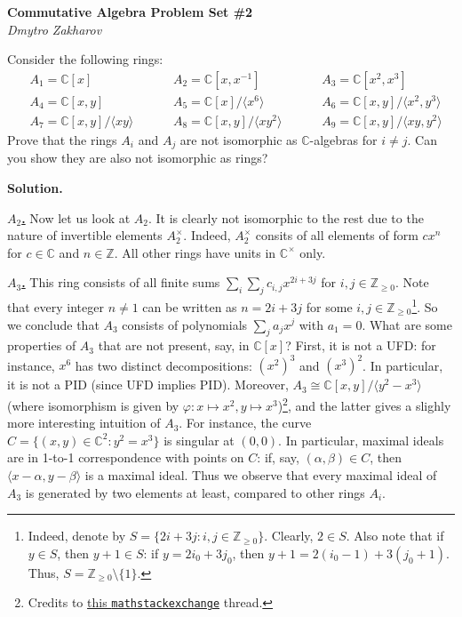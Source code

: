 \documentclass{template}
\begin{document}
\begin{center}
    \Large \textcolor{blue!70!black}{\textbf{Commutative Algebra Problem Set \#2}} \\
    \normalsize \textit{Dmytro Zakharov}
\end{center}

\begin{problem}[Exercise 1]
    Consider the following rings:
    \begin{align*}
        &A_1 = \mathbb{C}[x] && &&A_2 = \mathbb{C}[x,x^{-1}] && &&A_3 = \mathbb{C}[x^2,x^3] \\
        &A_4 = \mathbb{C}[x,y] && &&A_5 = \mathbb{C}[x]/\langle x^6 \rangle && &&A_6 = \mathbb{C}[x,y]/\langle x^2, y^3 \rangle \\
        &A_7 = \mathbb{C}[x,y]/\langle xy \rangle && &&A_8 = \mathbb{C}[x,y] / \langle xy^2 \rangle && && A_9 = \mathbb{C}[x,y] / \langle xy, y^2 \rangle
    \end{align*}
    Prove that the rings $A_i$ and $A_j$ are not isomorphic as
$\mathbb{C}$-algebras for $i \neq j$. Can you show they are also not isomorphic
as rings?
\end{problem}

\textbf{Solution.} 

\textcolor{blue!70!black}{\textbf{\underline{$A_2$.}}} Now let us look at $A_2$.
It is clearly not isomorphic to the rest due to the nature of invertible
elements $A_2^{\times}$. Indeed, $A_2^{\times}$ consits of all elements of form
$cx^n$ for $c \in \mathbb{C}$ and $n \in \mathbb{Z}$. All other rings have units
in $\mathbb{C}^{\times}$ only.

\textcolor{blue!70!black}{\textbf{\underline{$A_3$.}}} This ring consists of all
finite sums $\sum_i\sum_j c_{i,j}x^{2i+3j}$ for $i,j \in \mathbb{Z}_{\geq 0}$.
Note that every integer $n \neq 1$ can be written as $n=2i+3j$ for some $i,j \in
\mathbb{Z}_{\geq 0}$\footnote{Indeed, denote by $S=\{2i+3j: i,j \in
\mathbb{Z}_{\geq 0}\}$. Clearly, $2 \in S$. Also note that if $y \in S$, then
$y+1 \in S$: if $y=2i_0+3j_0$, then $y+1=2(i_0-1)+3(j_0+1)$. Thus,
$S=\mathbb{Z}_{\geq 0} \setminus \{1\}$.}. So we conclude that $A_3$ consists of
polynomials $\sum_j a_jx^j$ with $a_1=0$. What are some properties of $A_3$ that
are not present, say, in $\mathbb{C}[x]$? First, it is not a UFD: for instance, $x^6$ has
two distinct decompositions: $(x^2)^3$ and $(x^3)^2$. In particular, it is not a
PID (since UFD implies PID). Moreover, $A_3 \cong \mathbb{C}[x,y]/\langle
y^2-x^3 \rangle$ (where isomorphism is given by $\varphi: x \mapsto x^2, y
\mapsto x^3$)\footnote{Credits to
\href{https://math.stackexchange.com/a/5081023}{this \texttt{mathstackexchange}}
thread.}, and the latter gives a slighly more interesting intuition of $A_3$.
For instance, the curve $C=\{(x,y) \in \mathbb{C}^2: y^2=x^3\}$ is singular at
$(0,0)$. In particular, maximal ideals are in 1-to-1 correspondence with points
on $C$: if, say, $(\alpha,\beta) \in C$, then $\langle x-\alpha, y-\beta
\rangle$ is a maximal ideal. Thus we observe that every maximal ideal of $A_3$
is generated by two elements at least, compared to other rings $A_i$.
\end{document}
